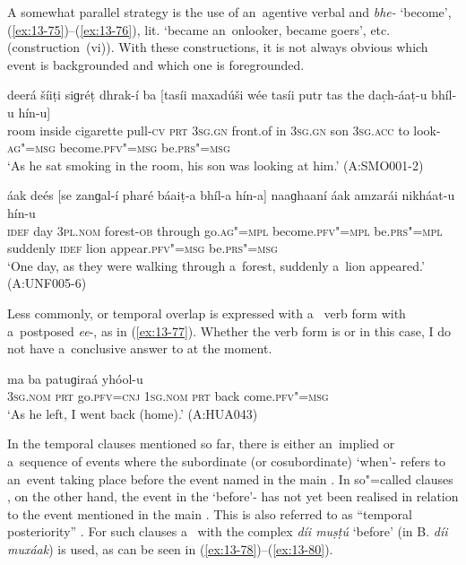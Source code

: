 A somewhat parallel strategy is the use of an~agentive verbal  and \textit{bhe-} `become', (\ref{ex:13-75})--(\ref{ex:13-76}), lit. `became an~onlooker, became goers', etc. (construction~(vi)). With these constructions, it is not always obvious which event is backgrounded and which one is foregrounded. 

\begin{exe}
\ex
\label{ex:13-75}
\gll deerá šíiṭi siɡréṭ dhrak-í ba [tasíi maxadúši wée tasíi putr tas the dac̣h-áaṭ-u bhíl-u hín-u] \\
room inside cigarette pull-\textsc{cv} \textsc{prt} \textsc{3sg.gn} front.of in \textsc{3sg.gn}  son \textsc{3sg.acc} to look-\textsc{ag"=msg} become.\textsc{pfv"=msg} be.\textsc{prs"=msg}  \\
\glt `As he sat smoking in the room, his son was looking at him.' (A:SMO001-2)

\ex
\label{ex:13-76}
\gll áak deés [se zanɡal-í pharé báaiṭ-a bhíl-a hín-a] naaɡhaaní áak amzarái nikháat-u hín-u \\
\textsc{idef} day \textsc{3pl.nom} forest-\textsc{ob} through go.\textsc{ag"=mpl}  become.\textsc{pfv"=mpl} be.\textsc{prs"=mpl} suddenly \textsc{idef} lion appear.\textsc{pfv"=msg} be.\textsc{prs"=msg}  \\
\glt `One day, as they were walking through a~forest, suddenly a~lion appeared.' (A:UNF005-6) 
\end{exe}

Less commonly,  or temporal overlap is expressed with a~ verb form with a~postposed \textit{ee}-, as in (\ref{ex:13-77}). Whether the  verb form is  or  in this case, I do not have a~conclusive answer to at the moment.

\begin{exe}
\ex
\label{ex:13-77}
\gll [so ta ɡúum=ee] ma ba patuɡiraá yhóol-u \\
\textsc{3sg.nom} \textsc{prt} go.\textsc{pfv=cnj} \textsc{1sg.nom} \textsc{prt} back  come.\textsc{pfv"=msg} \\
\glt `As he left, I went back (home).' (A:HUA043) 
\end{exe}

 In the temporal clauses mentioned so far, there is either an~implied  or a~sequence of events where the subordinate (or cosubordinate) `when'- refers to an~event taking place before the event named in the main . In so"=called  clauses \citep[327]{givon2001b}, on the other hand, the event in the `before'- has not yet been realised in relation to the event mentioned in the main  \citep[247--248]{thompsonetal2007}. This is also referred to as ``temporal posteriority'' \citep[159]{cristofaro2005}. For such clauses a~ with the complex  \textit{díi muṣṭú} `before' (in B. \textit{díi muxáak}) is used, as can be seen in (\ref{ex:13-78})--(\ref{ex:13-80}).

